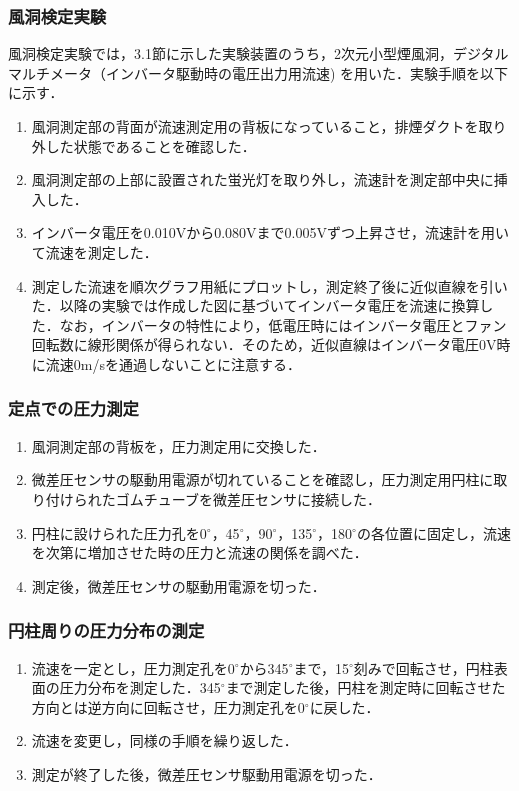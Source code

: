 \documentclass[a4paper,11pt,uplatex]{jsarticle}
\begin{document}
\subsubsection{風洞検定実験}
風洞検定実験では，3.1節に示した実験装置のうち，2次元小型煙風洞，デジタルマルチメータ（インバータ駆動時の電圧出力用流速)
を用いた．実験手順を以下に示す．
\begin{enumerate}
  \item 風洞測定部の背面が流速測定用の背板になっていること，排煙ダクトを取り外した状態であることを確認した．
  \item 風洞測定部の上部に設置された蛍光灯を取り外し，流速計を測定部中央に挿入した．
  \item インバータ電圧を0.010Vから0.080Vまで0.005Vずつ上昇させ，流速計を用いて流速を測定した．
  \item 測定した流速を順次グラフ用紙にプロットし，測定終了後に近似直線を引いた．以降の実験では作成した図に基づいてインバータ電圧を流速に換算した．なお，インバータの特性により，低電圧時にはインバータ電圧とファン回転数に線形関係が得られない．そのため，近似直線はインバータ電圧0V時に流速0m/sを通過しないことに注意する．
\end{enumerate}
\subsubsection{定点での圧力測定}
\begin{enumerate}
  \item 風洞測定部の背板を，圧力測定用に交換した．
  \item 微差圧センサの駆動用電源が切れていることを確認し，圧力測定用円柱に取り付けられたゴムチューブを微差圧センサに接続した．
  \item 円柱に設けられた圧力孔を0$^\circ$，45$^\circ$，90$^\circ$，135$^\circ$，180$^\circ$の各位置に固定し，流速を次第に増加させた時の圧力と流速の関係を調べた．
  \item 測定後，微差圧センサの駆動用電源を切った．
\end{enumerate}

\subsubsection{円柱周りの圧力分布の測定}
\begin{enumerate}
  \item 流速を一定とし，圧力測定孔を0$^\circ$から345$^\circ$まで，15$^\circ$刻みで回転させ，円柱表面の圧力分布を測定した．345$^\circ$まで測定した後，円柱を測定時に回転させた方向とは逆方向に回転させ，圧力測定孔を0$^\circ$に戻した．
  \item 流速を変更し，同様の手順を繰り返した．
  \item 測定が終了した後，微差圧センサ駆動用電源を切った．
\end{enumerate}
\end{document}
